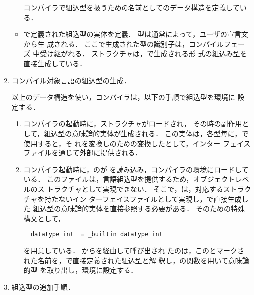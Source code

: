 \begin{enumerate}
\begin{itemize}
	コンパイラで組込型を扱うための名前としてのデータ構造を定義してい
る．

\item {}

	で定義された組込型の実体を定義．
	型は通常によって，ユーザの宣言文から生
成される．
	ここで生成された型の識別子は，コンパイルフェーズ
中受け継がれる．
	ストラクチャは，で生成される形
式の組込み型を直接生成している．
\end{itemize}

\item コンパイル対象言語の組込型の生成．

	以上のデータ構造を使い，コンパイラは，以下の手順で組込型を環境に
設定する．
\begin{enumerate}
\item コンパイラの起動時に，ストラクチャがロードされ，
その時の副作用として，組込型の意味論的実体が生成される．
	この実体は，各型毎に，で使用すると，そ
れを変換しのための変換したとして，インター
フェイスファイルを通じて外部に提供される．

\item コンパイラ起動時に，のが
を読み込み，コンパイラの環境にロードしている．
	このファイルは，言語組込型を提供するため，オブジェクトレベルのス
トラクチャとして実現できない．
	そこで，は，対応するストラクチャを持たないイン
ターフェイスファイルとして実現し，で直接生成した
組込型の意味論的実体を直接参照する必要がある．
	そのための特殊構文として，
\begin{verbatim}
  datatype int  = _builtin datatype int
\end{verbatim}
を用意している．
	からを経由して呼び出され
たのは，このとマークさ
れた名前を，で直接定義された組込型と解
釈し，の関数を用いて意味論的型
を取り出し，環境に設定する．
\end{enumerate}
\item 組込型の追加手順．


\end{enumerate}
